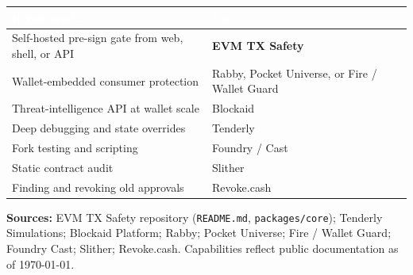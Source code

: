 \documentclass[10pt,a4paper]{article}
\begin{document}
\begin{table}[h]
\centering
\renewcommand{\arraystretch}{1.4}
\small
\begin{tabularx}{\textwidth}{>{\raggedright\arraybackslash}p{7.2cm} >{\raggedright\arraybackslash}X}
\toprule
\rowcolor{hdr}
\textcolor{white}{\textbf{If you need\ldots}} &
\textcolor{white}{\textbf{Use}} \\
\midrule
Self-hosted pre-sign gate from web, shell, or API
    &\cellcolor{green!18}\textbf{EVM TX Safety} \\
Wallet-embedded consumer protection
    & Rabby, Pocket Universe, or Fire / Wallet Guard \\
Threat-intelligence API at wallet scale
    & Blockaid \\
Deep debugging and state overrides
    & Tenderly \\
Fork testing and scripting
    & Foundry / Cast \\
Static contract audit
    & Slither \\
Finding and revoking old approvals
    & Revoke.cash \\
\bottomrule
\end{tabularx}
\end{table}

\vfill
\noindent\footnotesize
\textbf{Sources:} EVM TX Safety repository (\texttt{README.md},
\texttt{packages/core}); Tenderly Simulations; Blockaid Platform; Rabby;
Pocket Universe; Fire / Wallet Guard; Foundry Cast; Slither; Revoke.cash.
Capabilities reflect public documentation as of \today.
\end{document}
